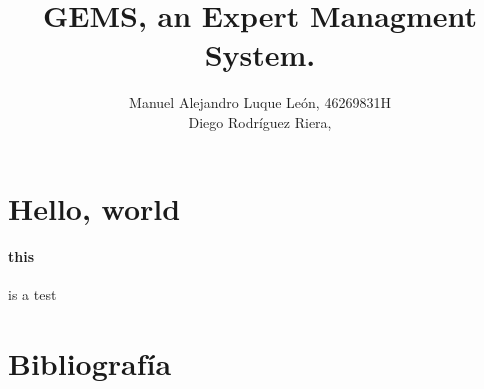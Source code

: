 \documentclass[a4paper,10pt]{article}
\title{GEMS, an Expert Managment System.}
\author{Manuel Alejandro Luque León, 46269831H\\Diego Rodríguez Riera, }
\begin{document}
\maketitle
\pagebreak
\tableofcontents
\pagebreak

\section{Hello, world}
\paragraph{this}is a test
\pagebreak

\section{Bibliografía}
\cite{minerales}



\end{document}
